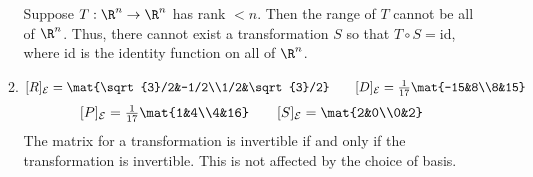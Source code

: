 \begin{enumerate}
\begin{enumerate}
					Suppose $T:\R^n\to\R^n$ has rank $< n$. Then the range of $T$ cannot
					be all of $\R^n$. Thus, there cannot exist a transformation $S$ so that
					$T\circ S=$id, where id is the identity function on all of $\R^n$.
				\item
					\[
						[R]_{\mathcal E} = \mat{\sqrt{3}/2&-1/2\\1/2&\sqrt{3}/2}\qquad
						[D]_{\mathcal E} = \tfrac{1}{17}\mat{-15&8\\8&15}
						\]\[
						[P]_{\mathcal E} = \tfrac{1}{17}\mat{1&4\\4&16}\qquad
						[S]_{\mathcal E} = \mat{2&0\\0&2}
					\]
					The matrix for a transformation is invertible if and only if the
					transformation is invertible. This is not affected by the choice of basis.
			\end{enumerate}
		\end{enumerate}
